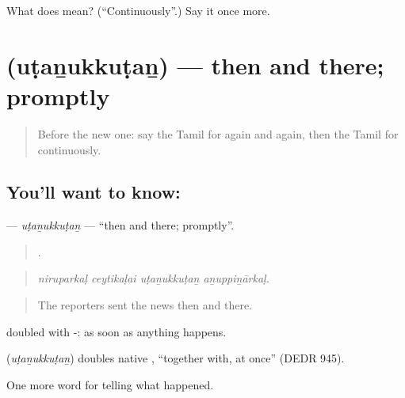 \begin{tcolorbox}[breakable,colback=teal!4,colframe=teal!35!black,title={Before you move on}]
What does  mean? (\textquotedblleft{}Continuously\textquotedblright{}.) Say it once more.
\end{tcolorbox}
\section[\texorpdfstring{\ta{உடனுக்குடன்} (uṭaṉukkuṭaṉ)}{உடனுக்குடன் (uṭaṉukkuṭaṉ)}]{ (uṭaṉukkuṭaṉ) — then and there; promptly}

\label{lesson:TA-C317-utanukkutan}



\begin{quote}
Before the new one: say the Tamil for again and again, then the Tamil for continuously.
\end{quote}

\subsection*{You'll want to know: }
\textbf{} — \emph{uṭaṉukkuṭaṉ} — \textquotedblleft{}then and there; promptly\textquotedblright{}.

\begin{quote}
   .
\end{quote}

\begin{quote}
\emph{niruparkaḷ ceytikaḷai uṭaṉukkuṭaṉ aṉuppiṉārkaḷ.}
\end{quote}

\begin{quote}
The reporters sent the news then and there.
\end{quote}

 doubled with -: as soon as anything happens.

\begin{cousinweb}
\textbf{} (\emph{uṭaṉukkuṭaṉ}) doubles native , \textquotedblleft{}together with, at once\textquotedblright{} (DEDR 945).
\end{cousinweb}

\begin{grammarlens}[title={What you've built}]
One more word for telling what happened.
\end{grammarlens}

